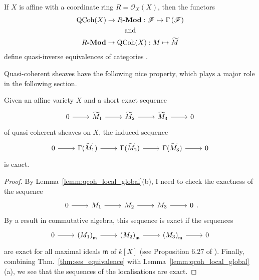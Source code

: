 \begin{cat}
  If $X$ is affine with a coordinate ring $R=\mathscr{O}_X(X)$,
  then the functors 
  \begin{gather*}
  \text{QCoh}(X)\to R\textbf{-Mod}
  :\mathscr{F}\mapsto\Gamma\left(\mathscr{F}\right)
  \\\text{and}\\
  R\textbf{-Mod}\to \text{QCoh}(X):M\mapsto\widetilde{M}
  \end{gather*}
  define quasi-inverse equivalences of categories \cite[\href{https://stacks.math.columbia.edu/tag/01IB}{Tag 01IB}]{stacks-project}.
\end{cat}
Quasi-coherent sheaves have the following nice property, which plays a
major role in the following section.
\begin{prop}\label{prop:qcoh_gsec_exact}
  Given an affine variety $X$ and a short exact sequence
  \[\begin{tikzcd}
      0\rar & \cm_{1}\rar & \cm_{2}\rar & \cm_{3}\rar & 0
    \end{tikzcd}\]
  of quasi-coherent sheaves on $X$, the induced sequence
  \[\begin{tikzcd}
      0\rar & \Gamma(\cm_{1})\rar & \Gamma(\cm_{2})\rar
      & \Gamma(\cm_{3})\rar & 0
    \end{tikzcd}\]
  is exact.
\end{prop}
\begin{proof}
  By Lemma~\ref{lemm:qcoh_local_global}(b), I need to check the exactness of
  the sequence
  \[\begin{tikzcd}
      0\rar & M_{1}\rar & M_{2}\rar & M_{3}\rar & 0
    \end{tikzcd}.\]
  By a result in commutative algebra, this sequence is exact if the sequences
  \[\begin{tikzcd}
      0\rar & \left(M_{1}\right)_{\mathfrak{m}}\rar
      & \left(M_{2}\right)_{\mathfrak{m}}\rar
      & \left(M_{3}\right)_{\mathfrak{m}}\rar & 0
    \end{tikzcd}\]
  are exact for all maximal ideals $\mathfrak{m}$ of $k[X]$
  (see Proposition 6.27 of \cite{gathmann_comm}). Finally, combining
  Thm.~\ref{thm:ses_equivalence} with Lemma~\ref{lemm:qcoh_local_global}(a),
  we see that the sequences of the localisations are exact.
\end{proof}
